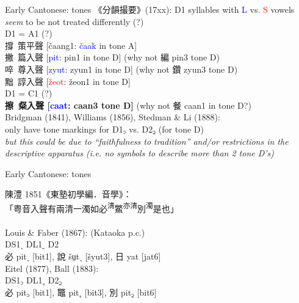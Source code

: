 \documentclass{beamer}
\begin{document}
\begin{frame}[fragile]{Early Cantonese: tones}
《分韻撮要》(17xx): D1 syllables with \textcolor{blue}{L} vs. \textcolor{red}{S} vowels \textit{seem} to be not treated differently (?)\\
\smallskip
D1 = A1 (?)\\
撐\ 策平聲 [čaang1: \textcolor{blue}{čaak} in tone A]\\
撇\ 篇入聲 [\textcolor{blue}{pit}: pin1 in tone D] {\scriptsize (why not 編 pin3 tone D)}\\
啐\ 尊入聲 [\textcolor{blue}{zyut}: zyun1 in tone D] {\scriptsize (why not 鑽 zyun3 tone D)}\\
黜\ 諄入聲 [\textcolor{red}{žeot}: žeon1 in tone D]\\
\smallskip
D1 = C1 (?)\\
\textbf{擦\ 粲入聲 [\textcolor{blue}{caat}: caan3 tone D]} {\scriptsize (why not 餐 caan1 in tone D?)}\\
\bigskip
Bridgman (1841), Williams (1856), Stedman \& Li (1888):\\
only have tone markings for D1꜆ vs. D2꜇ (for tone D)\\ 
\quad \textit{\footnotesize but this could be due to \enquote{faithfulness to tradition} and/or restrictions in the descriptive apparatus (i.e. no symbols to describe more than 2 tone D's)}

\end{frame}

\begin{frame}[fragile]{Early Cantonese: tones}

陳澧 1851《東塾初學編．音學》：\\
\medskip
「粤音入聲有兩清一濁如必\textsuperscript{清}鱉\textsuperscript{亦清}別\textsuperscript{濁}是也」\\
\\
\bigskip
Louis \& Faber (1867): (Kataoka p.c.)\\
DS1ˏ DL1\underline{ˏ} D2\\
必 pitˏ [bit1], 說 šṳt\underline{ˏ} [šyut3], 日 yat [jat6]\\

\medskip
Eitel (1877), Ball (1883):\\
DS1꜆ DL1˳ D2꜇\\
必 pit꜆ [bit1], 鼈 pit˳ [bit3], 別 pit꜇ [bit6]\\

\end{frame}
\end{document}

